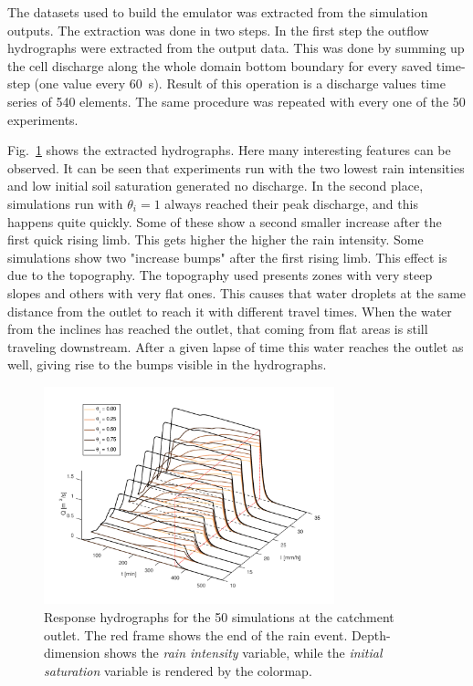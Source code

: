The datasets used to build the emulator was extracted from the simulation outputs.
The extraction was done in two steps.
In the first step the outflow hydrographs were extracted from the output data. 
This was done by summing up the cell discharge along the whole domain bottom boundary for every saved time-step (one value every \SI{60}{\second}).
Result of this operation is a discharge values time series of \num{540} elements.
The same procedure was repeated with every one of the \num{50} experiments.

Fig.~\ref{fig:hydrographs3d} shows the extracted hydrographs.
Here many interesting features can be observed.
It can be seen that experiments run with the two lowest rain intensities and low initial soil saturation generated no discharge.
In the second place, simulations run with $\theta_i = \num{1}$ always reached their peak discharge, and this happens quite quickly.
Some of these show a second smaller increase after the first quick rising limb.
This gets higher the higher the rain intensity.
Some simulations show two "increase bumps" after the first rising limb.
This effect is due to the topography.
The topography used presents zones with very steep slopes and others with very flat ones.
This causes that water droplets at the same distance from the outlet to reach it with different travel times.
When the water from the inclines has reached the outlet, that coming from flat areas is still traveling downstream.
After a given lapse of time this water reaches the outlet as well, giving rise to the bumps visible in the hydrographs.\\

\begin{figure}[h]
  \centering
  \includegraphics[width=0.75\textwidth]{Figures/hydrographs3d.png}
  \caption{Response hydrographs for the \num{50} simulations at the catchment outlet. The red frame shows the end of the rain event. Depth-dimension shows the \emph{rain intensity} variable, while the \emph{initial saturation} variable is rendered by the colormap.}
  \label{fig:hydrographs3d}
\end{figure}

